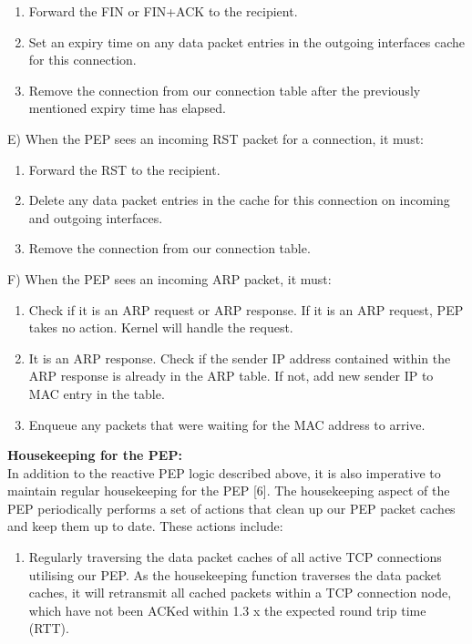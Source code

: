 \documentclass{uathesis}
\begin{document}
\begin{enumerate}
\item Forward the FIN or FIN+ACK to the recipient.
\item Set an expiry time on any data packet entries in the outgoing interfaces cache for this connection.
\item Remove the connection from our connection table after the previously mentioned expiry time has elapsed. \\
\end{enumerate}

\noindent E) When the PEP sees an incoming RST packet for a connection, it must:\\

\begin{enumerate}
\item Forward the RST to the recipient.
\item Delete any data packet entries in the cache for this connection on incoming and outgoing interfaces.
\item Remove the connection from our connection table. \\
\end{enumerate}

\noindent F) When the PEP sees an incoming ARP packet, it must:\\

\begin{enumerate}
\item Check if it is an ARP request or ARP response. If it is an ARP request, PEP takes no action. Kernel will handle the request.
\item It is an ARP response. Check if the sender IP address contained within the ARP response is already in the ARP table. If not, add new sender IP to MAC entry in the table.
\item Enqueue any packets that were waiting for the MAC address to arrive. \\
\end{enumerate}


\noindent \textbf{Housekeeping for the PEP:}\\
In addition to the reactive PEP logic described above, it is also imperative to maintain regular housekeeping for the PEP [6]. The housekeeping aspect of the PEP periodically performs a set of actions that clean up our PEP packet caches and keep them up to date. These actions include:  \\ 

\begin{enumerate}
\item Regularly traversing the data packet caches of all active TCP connections utilising our PEP. As the housekeeping function traverses the data packet caches, it will retransmit all cached packets within a TCP connection node, which have not been ACKed within 1.3 x the expected round trip time (RTT). \\
\end{enumerate}
\end{document}
